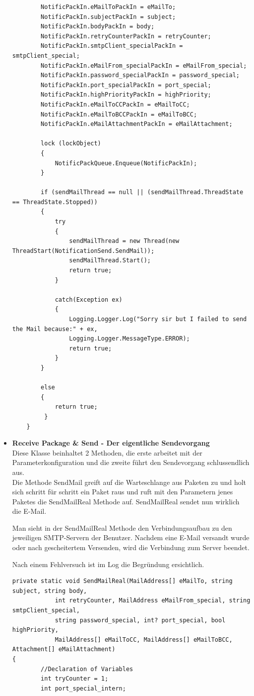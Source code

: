 \documentclass[12pt,a4paper]{report}
\begin{document}
\begin{onehalfspace}
\begin{itemize}
\begin{lstlisting}
        NotificPackIn.eMailToPackIn = eMailTo;
        NotificPackIn.subjectPackIn = subject;
        NotificPackIn.bodyPackIn = body;
        NotificPackIn.retryCounterPackIn = retryCounter;
        NotificPackIn.smtpClient_specialPackIn = smtpClient_special;
        NotificPackIn.eMailFrom_specialPackIn = eMailFrom_special;
        NotificPackIn.password_specialPackIn = password_special;
        NotificPackIn.port_specialPackIn = port_special;
        NotificPackIn.highPriorityPackIn = highPriority;
        NotificPackIn.eMailToCCPackIn = eMailToCC;
        NotificPackIn.eMailToBCCPackIn = eMailToBCC;
        NotificPackIn.eMailAttachmentPackIn = eMailAttachment;

        lock (lockObject)
        {
            NotificPackQueue.Enqueue(NotificPackIn);
        }

        if (sendMailThread == null || (sendMailThread.ThreadState == ThreadState.Stopped))
        {
        	try
            {
                sendMailThread = new Thread(new ThreadStart(NotificationSend.SendMail));
                sendMailThread.Start();
                return true;
            }

            catch(Exception ex)
            {
                Logging.Logger.Log("Sorry sir but I failed to send the Mail because:" + ex,
                Logging.Logger.MessageType.ERROR);
                return true;
            }
        }

        else
        {
            return true;
         }  
	}
\end{lstlisting}
\item \textbf{Receive Package \& Send - Der eigentliche Sendevorgang}\\
Diese Klasse beinhaltet 2 Methoden, die erste arbeitet mit der Parameterkonfiguration und die zweite führt den Sendevorgang schlussendlich aus.\\
Die Methode SendMail greift auf die Warteschlange aus Paketen zu und holt sich schritt für schritt ein Paket raus und ruft mit den Parametern jenes Paketes die SendMailReal Methode auf. SendMailReal sendet nun wirklich die E-Mail.

Man sieht in der SendMailReal Methode den Verbindungsaufbau zu den jeweiligen SMTP-Servern der Benutzer. Nachdem eine E-Mail versandt wurde oder nach gescheitertem Versenden, wird die Verbindung zum Server beendet.

Nach einem Fehlversuch ist im Log die Begründung ersichtlich.
\begin{lstlisting}
private static void SendMailReal(MailAddress[] eMailTo, string subject, string body, 
            int retryCounter, MailAddress eMailFrom_special, string smtpClient_special, 
            string password_special, int? port_special, bool highPriority, 
            MailAddress[] eMailToCC, MailAddress[] eMailToBCC, Attachment[] eMailAttachment)
{
        //Declaration of Variables
        int tryCounter = 1;
        int port_special_intern;


\end{lstlisting}
\end{itemize}
\end{onehalfspace}
\end{document}
